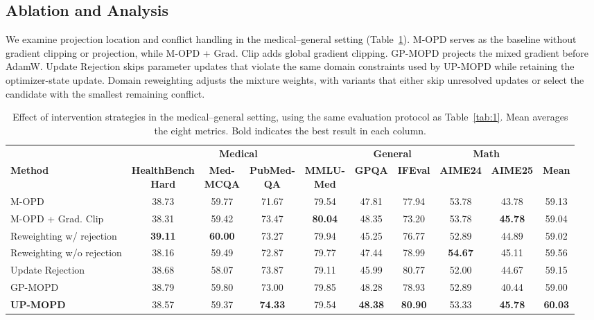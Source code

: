 \documentclass{article}
\begin{document}
\subsection{Ablation and Analysis}
\label{sec:exp_mechanism}

We examine projection location and conflict handling in the medical--general setting (Table~\ref{tab:ablation}). M-OPD serves as the baseline without gradient clipping or projection, while M-OPD + Grad. Clip adds global gradient clipping. GP-MOPD projects the mixed gradient before AdamW. Update Rejection skips parameter updates that violate the same domain constraints used by UP-MOPD while retaining the optimizer-state update. Domain reweighting adjusts the mixture weights, with variants that either skip unresolved updates or select the candidate with the smallest remaining conflict.

\begin{table}[t]
\centering
\caption{Effect of intervention strategies in the medical--general setting, using the same evaluation protocol as Table~\ref{tab:1}. Mean averages the eight metrics. Bold indicates the best result in each column.}
\label{tab:ablation}
\renewcommand{\arraystretch}{1.08}
\scriptsize
\setlength{\tabcolsep}{3pt}
\begin{tabular*}{\linewidth}{@{\extracolsep{\fill}}lccccccccc@{}}
\toprule
& \multicolumn{4}{c}{\textbf{Medical}}
& \multicolumn{2}{c}{\textbf{General}}
& \multicolumn{2}{c}{\textbf{Math}} & \\
\cmidrule(lr){2-5}\cmidrule(lr){6-7}\cmidrule(lr){8-9}
\textbf{Method}
& \shortstack{\textbf{HealthBench}\\\textbf{Hard}}
& \shortstack{\textbf{Med-}\\\textbf{MCQA}}
& \shortstack{\textbf{PubMed-}\\\textbf{QA}}
& \shortstack{\textbf{MMLU-}\\\textbf{Med}}
& \textbf{GPQA} & \textbf{IFEval}
& \textbf{AIME24} & \textbf{AIME25} & \textbf{Mean} \\
\midrule
M-OPD & 38.73 & 59.77 & 71.67 & 79.54 & 47.81 & 77.94 & 53.78 & 43.78 & 59.13 \\
M-OPD + Grad. Clip & 38.31 & 59.42 & 73.47 & \textbf{80.04} & 48.35 & 73.20 & 53.78 & \textbf{45.78} & 59.04 \\
Reweighting w/ rejection & \textbf{39.11} & \textbf{60.00} & 73.27 & 79.94 & 45.25 & 76.77 & 52.89 & 44.89 & 59.02 \\
Reweighting w/o rejection & 38.16 & 59.49 & 72.87 & 79.77 & 47.44 & 78.99 & \textbf{54.67} & 45.11 & 59.56 \\
Update Rejection & 38.68 & 58.07 & 73.87 & 79.11 & 45.99 & 80.77 & 52.00 & 44.67 & 59.15 \\
GP-MOPD & 38.79 & 59.80 & 73.00 & 79.85 & 48.28 & 78.93 & 52.89 & 40.44 & 59.00 \\
\midrule
\rowcolor{uprow}\textbf{UP-MOPD} & 38.57 & 59.37 & \textbf{74.33} & 79.54 & \textbf{48.38} & \textbf{80.90} & 53.33 & \textbf{45.78} & \textbf{60.03} \\
\bottomrule
\end{tabular*}
\end{table}
\end{document}
